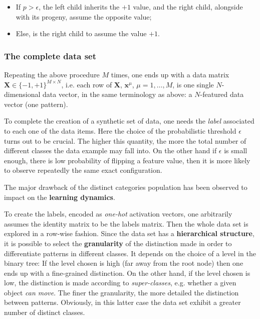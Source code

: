\documentclass[a4paper,12pt]{article}
\begin{document}
\begin{itemize}
	\item If $p > \epsilon$, the left child inherits the $+1$ value, and the right child, alongside with its progeny, assume the opposite value;
	\item Else, is the right child to assume the value $+1$.
\end{itemize}


\subsubsection{The complete data set}
\label{subsec:completeDS}

Repeating the above procedure $M$ times, one ends up with a data matrix $\bm{X} \in \{-1, +1\}^{M \times N}$, i.e. each row of $\bm{X}$, $\bm{x}^{\mu}$, $\mu = 1 , \dots , M$, is one single $N$-dimensional data vector, in the same terminology as above: a $N$-featured data vector (one pattern).

To complete the creation of a synthetic set of data, one needs the \textit{label} associated to each one of the data items. Here the choice of the probabilistic threshold $\epsilon$ turns out to be crucial. The higher this quantity, the more the total number of different classes the data example may fall into. On the other hand if $\epsilon$ is small enough, there is low probability of flipping a feature value, then it is more likely to observe repeatedly the same exact configuration. 

The major drawback of the distinct categories population has been observed to impact on the \textbf{learning dynamics}.

To create the labels, encoded as \textit{one-hot} activation vectors, one arbitrarily assumes the identity matrix to be the labels matrix. Then the whole data set is explored in a row-wise fashion. Since the data set has a \textbf{hierarchical structure}, it is possible to select the \textbf{granularity} of the distinction made in order to differentiate patterns in different classes. It depends on the choice of a level in the binary tree: If the level chosen is high (far away from the root node) then one ends up with a fine-grained distinction. On the other hand, if the level chosen is low, the distinction is made according to \textit{super-classes}, e.g. whether a given object \textit{can move}. The finer the granularity, the more detailed the distinction between patterns. Obviously, in this latter case the data set exhibit a greater number of distinct classes.
\end{document}

